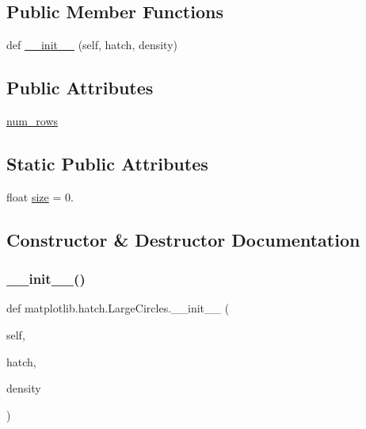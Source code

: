 \subsection*{Public Member Functions}
\begin{DoxyCompactItemize}
\item 
def \hyperlink{classmatplotlib_1_1hatch_1_1LargeCircles_a7e32dd14baeea1c02d316b046618485f}{\+\_\+\+\_\+init\+\_\+\+\_\+} (self, hatch, density)
\end{DoxyCompactItemize}
\subsection*{Public Attributes}
\begin{DoxyCompactItemize}
\item 
\hyperlink{classmatplotlib_1_1hatch_1_1LargeCircles_a662b3b3ba84f9a4cf4ff0231e37b0395}{num\+\_\+rows}
\end{DoxyCompactItemize}
\subsection*{Static Public Attributes}
\begin{DoxyCompactItemize}
\item 
float \hyperlink{classmatplotlib_1_1hatch_1_1LargeCircles_ad0b067abe3b67a524295e5af17327c3f}{size} = 0.
\end{DoxyCompactItemize}


\subsection{Constructor \& Destructor Documentation}
\mbox{\label{classmatplotlib_1_1hatch_1_1LargeCircles_a7e32dd14baeea1c02d316b046618485f}} 
\subsubsection{\texorpdfstring{\+\_\+\+\_\+init\+\_\+\+\_\+()}{\_\_init\_\_()}}
{\footnotesize\ttfamily def matplotlib.\+hatch.\+Large\+Circles.\+\_\+\+\_\+init\+\_\+\+\_\+ (\begin{DoxyParamCaption}\item[{}]{self,  }\item[{}]{hatch,  }\item[{}]{density }\end{DoxyParamCaption})}



